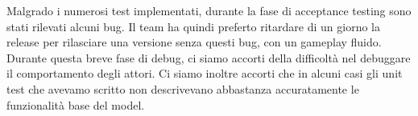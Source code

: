 Malgrado i numerosi test implementati, durante la fase di acceptance testing sono stati rilevati alcuni bug. Il team ha quindi preferto ritardare di un giorno la release per rilasciare una versione senza questi bug, con un gameplay fluido.
Durante questa breve fase di debug, ci siamo accorti della difficoltà nel debuggare il comportamento degli attori. Ci siamo inoltre accorti che in alcuni casi gli unit test che avevamo scritto non descrivevano abbastanza accuratamente le funzionalità base del model.
\newpage
